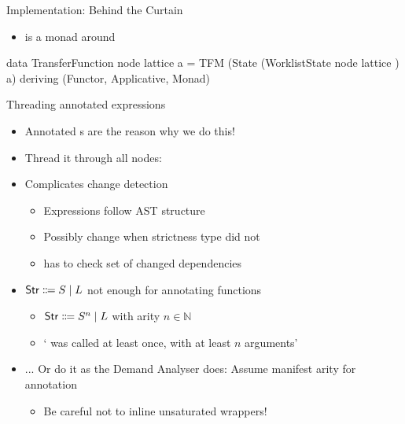 \documentclass{haskellbeamer}
\begin{document}
\begin{frame}[fragile]{Implementation: Behind the Curtain}
  \begin{itemize}
    \item {} is a  monad around 
  \end{itemize}
  \begin{center}
    \begin{minipage}{0.8\textwidth}
      \begin{haskell}
        data TransferFunction node lattice a
          = TFM (State (WorklistState node lattice ) a)
          deriving (Functor, Applicative, Monad)
      \end{haskell}
    \end{minipage}
  \end{center}
\end{frame}

\begin{frame}[fragile]{Threading annotated expressions}
  \begin{itemize}
    \item Annotated s are the reason why we do this!
    \item Thread it through all nodes: 
    \item Complicates change detection
      \begin{itemize}
        \item Expressions follow AST structure
        \item Possibly change when strictness type did not
        \item {} has to check set of changed dependencies
      \end{itemize}
    \item $\text{\textsf{Str}} \Coloneqq S \mid L$ not enough for annotating functions
      \begin{itemize}
        \item $\text{\textsf{Str}} \Coloneqq S^n \mid L$ with arity $n\in \mathbb{N}$
        \item ` was called at least once, with at least $n$ arguments'
      \end{itemize}
    \item ... Or do it as the Demand Analyser does: Assume manifest arity for annotation
      \begin{itemize}
        \item Be careful not to inline unsaturated wrappers!
      \end{itemize}
  \end{itemize}
\end{frame}
\end{document}
